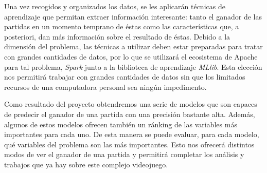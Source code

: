 Una vez recogidos y organizados los datos, se les aplicarán técnicas de
aprendizaje que permitan extraer información interesante: tanto el ganador
de las partidas en un momento temprano de éstas como las características que,
a posteriori, dan más información sobre el resultado de éstas. Debido a la
dimensión del problema, las técnicas a utilizar deben estar preparadas para
tratar con grandes cantidades de datos, por lo que se utilizará el ecosistema
de Apache para tal problema, \emph{Spark} junto a la biblioteca de aprendizaje
\emph{MLlib}. Esta elección nos permitirá trabajar con grandes cantidades de
datos sin que los limitados recursos de una computadora personal sea ningún
impedimento.

Como resultado del proyecto obtendremos una serie de modelos que son capaces
de predecir el ganador de una partida con una precisión bastante alta. Además,
algunos de estos modelos ofrecen también un ránking de las variables
más importantes para cada uno. De esta manera se puede evaluar, para cada
modelo, qué variables del problema son las más importantes. Esto nos ofrecerá
distintos modos de ver el ganador de una partida y permitirá completar los
análisis y trabajos que ya hay sobre este complejo videojuego.
